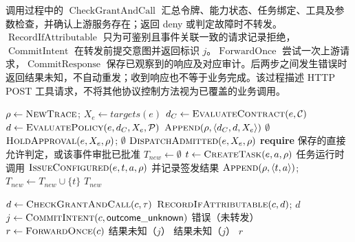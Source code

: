 调用过程中的 $\operatorname{CheckGrantAndCall}$ 汇总令牌、能力状态、任务绑定、工具及参数检查，并确认上游服务存在；返回 deny 或判定故障时不转发。$\operatorname{RecordIfAttributable}$ 只为可鉴别且事件关联一致的请求记录拒绝，$\operatorname{CommitIntent}$ 在转发前提交意图并返回标识 $j$。$\operatorname{ForwardOnce}$ 尝试一次上游请求，$\operatorname{CommitResponse}$ 保存已观察到的响应及对应审计。后两步之间发生错误时返回结果未知，不自动重发；收到响应也不等于业务完成。该过程描述 HTTP POST 工具请求，不将其他协议控制方法视为已覆盖的业务调用。

\begin{algorithm}[htbp]
\caption{E2AG 事件准入与任务分发}\label{alg:e2ag-v11}
\begin{algorithmic}[1]
  \State $\rho\gets\Call{NewTrace}{}$; $X_e\gets targets(e)$
  \State $d_C\gets\Call{EvaluateContract}{e,\mathcal C}$
  \State $d\gets\Call{EvaluatePolicy}{e,d_C,X_e,\mathcal P}$
  \State $\Call{Append}{\rho,\langle d_C,d,X_e\rangle}$
   \State \Return $\emptyset$ \EndIf
    \State $\Call{HoldApproval}{e,X_e,\rho}$; \Return $\emptyset$
  \EndIf
  \State \Return $\Call{DispatchAdmitted}{e,X_e,\rho}$
\EndProcedure
{}
  \State \textbf{require} 保存的直接允许判定，或该事件审批已批准
  \State $T_{new}\gets\emptyset$
    \State $t\gets\Call{CreateTask}{e,a,\rho}$
    \State 任务运行时调用 $\Call{IssueConfigured}{e,t,a,\rho}$ 并记录签发结果
    \State $\Call{Append}{\rho,\langle t,a\rangle}$; $T_{new}\gets T_{new}\cup\{t\}$
  \EndFor
  \State \Return $T_{new}$
\EndProcedure
\end{algorithmic}
\end{algorithm}

\begin{algorithm}[htbp]
\caption{E2AG 调用检查与结果记录}\label{alg:e2ag-call-rr022}
\begin{algorithmic}[1]
  \State $d\gets\Call{CheckGrantAndCall}{c,\tau}$
    \State $\Call{RecordIfAttributable}{c,d}$; \Return $d$
  \EndIf
  \State $j\gets\Call{CommitIntent}{c,\mathsf{outcome\_unknown}}$
   \State \Return 错误（未转发） \EndIf
  \State $r\gets\Call{ForwardOnce}{c}$
   \State \Return 结果未知（$j$） \EndIf
    \State \Return 结果未知（$j$）
  \EndIf
  \State \Return $r$
\EndProcedure
\end{algorithmic}
\end{algorithm}

